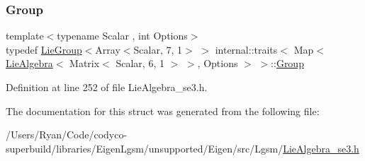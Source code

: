 \hypertarget{structinternal_1_1traits_3_01_map_3_01_lie_algebra_3_01_matrix_3_01_scalar_00_016_00_011_01_4_01_4_00_01_options_01_4_01_4_a13ab0b81517271df7b1e26758eb63b67}{}\label{structinternal_1_1traits_3_01_map_3_01_lie_algebra_3_01_matrix_3_01_scalar_00_016_00_011_01_4_01_4_00_01_options_01_4_01_4_a13ab0b81517271df7b1e26758eb63b67} 
\subsubsection{\texorpdfstring{Group}{Group}}
{\footnotesize\ttfamily template$<$typename Scalar , int Options$>$ \\
typedef \hyperlink{class_lie_group}{Lie\+Group}$<$Array$<$Scalar, 7, 1$>$ $>$ internal\+::traits$<$ Map$<$ \hyperlink{class_lie_algebra}{Lie\+Algebra}$<$ Matrix$<$ Scalar, 6, 1 $>$ $>$, Options $>$ $>$\+::\hyperlink{structinternal_1_1traits_3_01_map_3_01_lie_algebra_3_01_matrix_3_01_scalar_00_016_00_011_01_4_01_4_00_01_options_01_4_01_4_a13ab0b81517271df7b1e26758eb63b67}{Group}}



Definition at line 252 of file Lie\+Algebra\+\_\+se3.\+h.



The documentation for this struct was generated from the following file\+:\begin{DoxyCompactItemize}
\item 
/\+Users/\+Ryan/\+Code/codyco-\/superbuild/libraries/\+Eigen\+Lgsm/unsupported/\+Eigen/src/\+Lgsm/\hyperlink{_lie_algebra__se3_8h}{Lie\+Algebra\+\_\+se3.\+h}\end{DoxyCompactItemize}
